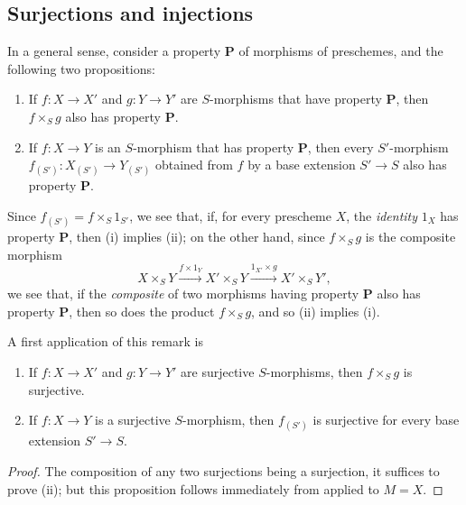 \subsection{Surjections and injections}
\label{subsection:I.3.5}

\begin{env}[3.5.1]
\label{I.3.5.1}
In a general sense, consider a property $\textbf{P}$ of morphisms of preschemes, and the following two propositions:
\begin{enumerate}
  \item[(i)] If $f:X\to X'$ and $g:Y\to Y'$ are $S$-morphisms that have property $\textbf{P}$, then $f\times_S g$ also has property $\textbf{P}$.
  \item[(ii)] If $f:X\to Y$ is an $S$-morphism that has property $\textbf{P}$, then every $S'$-morphism $f_{(S')}:X_{(S')}\to Y_{(S')}$ obtained from $f$ by a base extension $S'\to S$ also has property $\textbf{P}$.
\end{enumerate}

Since $f_{(S')}=f\times_S 1_{S'}$, we see that, if, for every prescheme $X$, the \emph{identity} $1_X$ has property $\textbf{P}$, then (i) implies (ii); on the other hand, since $f\times_S g$ is the composite morphism
\[
  X\times_S Y\xrightarrow{f\times1_Y}X'\times_S Y\xrightarrow{1_{X'}\times g}X'\times_S Y',
\]
we see that, if the \emph{composite} of two morphisms having property $\textbf{P}$ also has property $\textbf{P}$, then so does the product $f\times_S g$, and so (ii) implies (i).
\end{env}

A first application of this remark is
\begin{proposition}[3.5.2]
\label{I.3.5.2}
\medskip\noindent
\begin{enumerate}
  \item[{\rm(i)}] If $f:X\to X'$ and $g:Y\to Y'$ are surjective $S$-morphisms, then $f\times_S g$ is surjective.
  \item[{\rm(ii)}] If $f:X\to Y$ is a surjective $S$-morphism, then $f_{(S')}$ is surjective for every base extension $S'\to S$.
\end{enumerate}
\end{proposition}

\begin{proof}
The composition of any two surjections being a surjection, it suffices to prove (ii); but this proposition follows immediately from  applied to $M=X$.
\end{proof}

